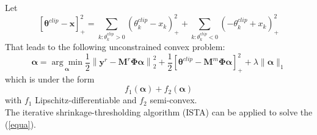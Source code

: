 \documentclass{article}
\numberwithin{dummy}{section}
\begin{document}
Let
$$
\left[\boldsymbol{\theta}^{c l i p}-\mathbf{x}\right]_{+}^{2}=\sum_{k: \theta_{k}^{c l i p}>0}\left(\theta_{k}^{c l i p}-x_{k}\right)_{+}^{2}+\sum_{k: \theta_{k}^{c l i p}<0}\left(-\theta_{k}^{c l i p}+x_{k}\right)_{+}^{2}
$$
That leads to the following unconstrained convex problem:
\begin{equation}
\boldsymbol{\alpha}=\underset{\boldsymbol{\alpha}}{\arg \min } \frac{1}{2}\left\|\mathbf{y}^{r}-\mathbf{M}^{r} \boldsymbol{\Phi} \boldsymbol{\alpha}\right\|_{2}^{2}+\frac{1}{2}\left[\boldsymbol{\theta}^{c l i p}-\mathbf{M}^{m} \boldsymbol{\Phi} \boldsymbol{\alpha}\right]_{+}^{2}+ \lambda\|\boldsymbol{\alpha}\|_{1}
\label{equa}
\end{equation}
which is under the form
$$
f_{1}(\boldsymbol{\alpha})+f_{2}(\boldsymbol{\alpha})
$$
with $f_{1}$ Lipschitz-differentiable and $f_{2}$ semi-convex.\\
The  iterative shrinkage-thresholding algorithm (ISTA)  \cite{4959678} can be applied to solve the (\ref{equa}).\\
\end{document}
